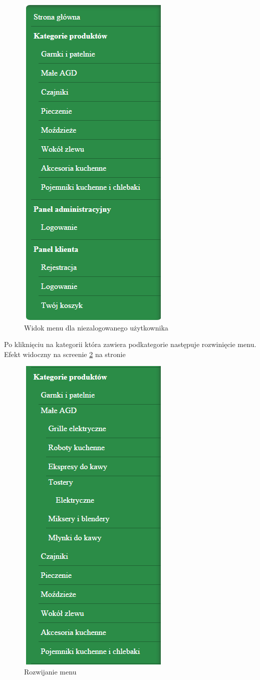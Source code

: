 \begin{figure}[H]
	\centering
	\includegraphics {fig/menu_nie_zalogowany}
	\caption{Widok menu dla niezalogowanego użytkownika}
	\label{fig:nie_zalogowany}
\end{figure}
Po kliknięciu na kategorii która zawiera podkategorie następuje rozwinięcie menu. Efekt widoczny na screenie \ref{fig:menu_rozwijalne} na stronie \pageref{fig:menu_rozwijalne}
\begin{figure}[H]
	\centering
	\includegraphics {fig/menu_rozwijanie}
	\caption{Rozwijanie menu}
	\label{fig:menu_rozwijalne}
\end{figure}